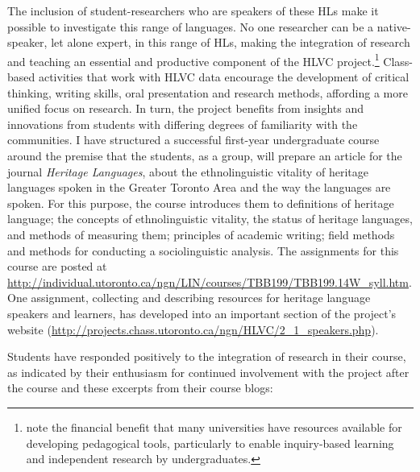 \documentclass[output=paper]{LSP/langsci}
\begin{document}
The inclusion of student-researchers who are speakers of these HLs make it possible to investigate this range of languages. No one researcher can be a native-speaker, let alone expert, in this range of HLs, making the integration of research and teaching an essential and productive component of the HLVC project.\footnote{\citet{van_herk_undergraduate-conducted_2015} note the financial benefit that many universities have resources available for developing pedagogical tools, particularly to enable inquiry-based learning and independent research by undergraduates.}  Class-based activities that work with HLVC data encourage the development of critical thinking, writing skills, oral presentation and research methods, affording a more unified focus on research. In turn, the project benefits from insights and innovations from students with differing degrees of familiarity with the communities. I have structured a successful first-year undergraduate course around the premise that the students, as a group, will prepare an article for the journal \textit{Heritage Languages}, about the ethnolinguistic vitality of heritage languages spoken in the Greater Toronto Area and the way the languages are spoken. For this purpose, the course introduces them to definitions of {\textquotedbl}heritage language;{\textquotedbl} the concepts of ethnolinguistic vitality, the status of heritage languages, and methods of measuring them; principles of academic writing; field methods and methods for conducting a sociolinguistic analysis. The assignments for this course are posted at \url{http://individual.utoronto.ca/ngn/LIN/courses/TBB199/TBB199.14W_syll.htm}. One assignment, collecting and describing resources for heritage language speakers and learners, has developed into an important section of the project’s website  (\url{http://projects.chass.utoronto.ca/ngn/HLVC/2_1_speakers.php}). 

Students have responded positively to the integration of research in their course, as indicated by their enthusiasm for continued involvement with the project after the course and these excerpts from their course blogs:
\end{document}
